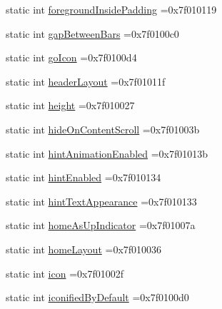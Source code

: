 \begin{DoxyCompactItemize}
\item 
static int \hyperlink{classandroid_1_1support_1_1graphics_1_1drawable_1_1animated_1_1R_1_1attr_aba3bcc54488218485293a9d2f4223580}{foreground\+Inside\+Padding} =0x7f010119
\item 
static int \hyperlink{classandroid_1_1support_1_1graphics_1_1drawable_1_1animated_1_1R_1_1attr_afc4b54e72600db6abee0f8bfd82c2beb}{gap\+Between\+Bars} =0x7f0100c0
\item 
static int \hyperlink{classandroid_1_1support_1_1graphics_1_1drawable_1_1animated_1_1R_1_1attr_ab8cf6163c0aff6e2c0915a1081ee47da}{go\+Icon} =0x7f0100d4
\item 
static int \hyperlink{classandroid_1_1support_1_1graphics_1_1drawable_1_1animated_1_1R_1_1attr_a6c66896e780a5792f1e4f64a3a8565a1}{header\+Layout} =0x7f01011f
\item 
static int \hyperlink{classandroid_1_1support_1_1graphics_1_1drawable_1_1animated_1_1R_1_1attr_a549b8f423d52bdd3f24e190ac8720092}{height} =0x7f010027
\item 
static int \hyperlink{classandroid_1_1support_1_1graphics_1_1drawable_1_1animated_1_1R_1_1attr_a2f80718ea85da01121e1763dfd22caef}{hide\+On\+Content\+Scroll} =0x7f01003b
\item 
static int \hyperlink{classandroid_1_1support_1_1graphics_1_1drawable_1_1animated_1_1R_1_1attr_a148fa3a321bb89435d0f72bce7b06937}{hint\+Animation\+Enabled} =0x7f01013b
\item 
static int \hyperlink{classandroid_1_1support_1_1graphics_1_1drawable_1_1animated_1_1R_1_1attr_a7e21571ca0a58f9d9a356f4b193a8ad5}{hint\+Enabled} =0x7f010134
\item 
static int \hyperlink{classandroid_1_1support_1_1graphics_1_1drawable_1_1animated_1_1R_1_1attr_a5d392e948cd7a4e94ce70f51435c13b6}{hint\+Text\+Appearance} =0x7f010133
\item 
static int \hyperlink{classandroid_1_1support_1_1graphics_1_1drawable_1_1animated_1_1R_1_1attr_a246dce0b8806639e751babf1a5504c8d}{home\+As\+Up\+Indicator} =0x7f01007a
\item 
static int \hyperlink{classandroid_1_1support_1_1graphics_1_1drawable_1_1animated_1_1R_1_1attr_af62d1d140834e96bf14c5d7552c18ad3}{home\+Layout} =0x7f010036
\item 
static int \hyperlink{classandroid_1_1support_1_1graphics_1_1drawable_1_1animated_1_1R_1_1attr_ad1181f34c4a4555c73a20dcad366a28e}{icon} =0x7f01002f
\item 
static int \hyperlink{classandroid_1_1support_1_1graphics_1_1drawable_1_1animated_1_1R_1_1attr_a08a22e8728de4121210ff34f199f4d55}{iconified\+By\+Default} =0x7f0100d0

\end{DoxyCompactItemize}
